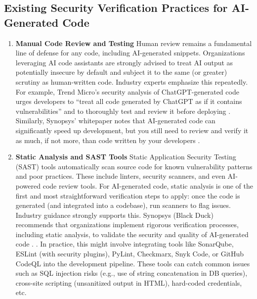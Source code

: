 \subsection{Existing Security Verification Practices for AI-Generated Code}
\begin{enumerate}
    \item \textbf{Manual Code Review and Testing} Human review remains a fundamental line of defense for any code, including AI-generated snippets. Organizations leveraging AI code assistants are strongly advised to treat AI output as potentially insecure by default and subject it to the same (or greater) scrutiny as human-written code. Industry experts emphasize this repeatedly. For example, Trend Micro’s security analysis of ChatGPT-generated code urges developers to “treat all code generated by ChatGPT as if it contains vulnerabilities” and to thoroughly test and review it before deploying \cite{trendmicro}. Similarly, Synopsys' whitepaper notes that AI-generated code can significantly speed up development, but you still need to review and verify it as much, if not more, than code written by your developers \cite{blackduck}.
    \item \textbf{Static Analysis and SAST Tools} Static Application Security Testing (SAST) tools automatically scan source code for known vulnerability patterns and poor practices. These include linters, security scanners, and even AI-powered code review tools. For AI-generated code, static analysis is one of the first and most straightforward verification steps to apply: once the code is generated (and integrated into a codebase), run scanners to flag issues. Industry guidance strongly supports this. Synopsys (Black Duck) recommends that organizations implement rigorous verification processes, including static analysis, to validate the security and quality of AI-generated code \cite{blackduck}. . In practice, this might involve integrating tools like SonarQube, ESLint (with security plugins), PyLint, Checkmarx, Snyk Code, or GitHub CodeQL into the development pipeline. These tools can catch common issues such as SQL injection risks (e.g., use of string concatenation in DB queries), cross-site scripting (unsanitized output in HTML), hard-coded credentials, etc.

\end{enumerate}
